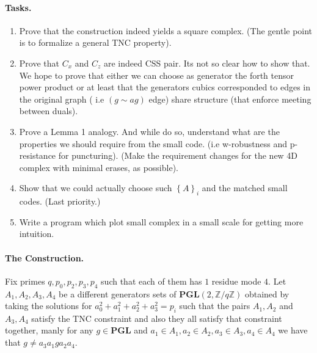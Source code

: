 \documentclass{article}
\begin{document}
\begin{multicols*}{2}
\paragraph{Tasks.}
	\begin{enumerate}
	  \item Prove that the construction indeed yields a square complex. (The gentle point is to formalize a general TNC property).  
	  \item Prove that $C_{x}$ and $C_{z}$ are indeed CSS pair. Its not so clear how to show that. We hope to prove that either we can choose as generator the forth tensor power product or at least that the generators cubics corresponded to edges in the original graph ( i.e $ \left( g \sim ag  \right) $ edge) share structure (that enforce meeting between duals).
	  \item Prove a Lemma 1 analogy. And while do so, understand what are the properties we should require from the small code.  
	    (i.e w-robustness and p-resistance for puncturing). 
	    (Make the requirement changes for the new 4D complex with minimal erases, as possible).
	  \item Show that we could actually choose such $\left\{ A \right\}_{i}$ and the matched small codes. (Last priority.) 
	  \item Write a program which plot small complex in a small scale for getting more intuition.  
	\end{enumerate}
 \paragraph{The Construction.} Fix primes $q,p_0,p_2,p_3,p_4$ such that each of them has $1 $ residue mode $4$. Let $A_{1},A_{2},A_{3},A_{4}$ be a different generators sets of $ \mathbf{PGL}(2 , \mathbb{Z} / q\mathbb{Z} )  $ 
  obtained by taking the solutions for $a_{0}^{2} + a_{1}^{2} +a_{2}^{2} +a_{3}^{2} = p_i $ such that the pairs $A_{1},A_{2}$ and $A_{3},A_{4}$ satisfy the 
  TNC constraint and also they all satisfy that constraint together, manly for any $g \in \mathbf{PGL}$  and $a_{1}\in A_{1}, a_{2} \in A_{2}, a_{3} \in A_{3}, a_{4} \in A_{4}$ we have that $ g \neq a_{3}a_{1}ga_{2}a_{4}$. 
  

\end{multicols*}
\end{document}
